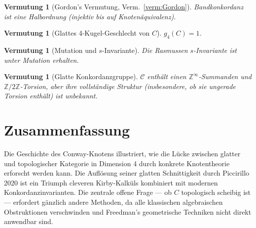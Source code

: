 \documentclass[12pt,a4paper]{amsart}
\newtheorem{vermutung}[theorem]{Vermutung}
\theoremstyle{definition}
\theoremstyle{remark}
\newcommand{\Z}{\mathbb{Z}}
\begin{document}
\begin{vermutung}[Gordon's Vermutung, Verm.~\ref{verm:Gordon}]
Bandkonkordanz ist eine Halbordnung (injektiv bis auf Knotenäquivalenz).
\end{vermutung}

\begin{vermutung}[Glattes 4-Kugel-Geschlecht von $C$]
$g_4(C) = 1$.
\end{vermutung}

\begin{vermutung}[Mutation und $s$-Invariante]
Die Rasmussen $s$-Invariante ist unter Mutation erhalten.
\end{vermutung}

\begin{vermutung}[Glatte Konkordanzgruppe]
$\mathcal{C}$ enthält einen $\Z^\infty$-Summanden und $\Z/2\Z$-Torsion,
aber ihre vollständige Struktur (insbesondere, ob sie ungerade Torsion
enthält) ist unbekannt.
\end{vermutung}

\section{Zusammenfassung}

Die Geschichte des Conway-Knotens illustriert, wie die Lücke zwischen
glatter und topologischer Kategorie in Dimension 4 durch konkrete
Knotentheorie erforscht werden kann. Die Auflösung seiner glatten
Schnittigkeit durch Piccirillo 2020 ist ein Triumph cleveren Kirby-Kalküls
kombiniert mit modernen Konkordanzinvarianten. Die zentrale offene Frage
— ob $C$ topologisch scheibig ist — erfordert gänzlich andere Methoden,
da alle klassischen algebraischen Obstruktionen verschwinden und Freedman's
geometrische Techniken nicht direkt anwendbar sind.
\end{document}
